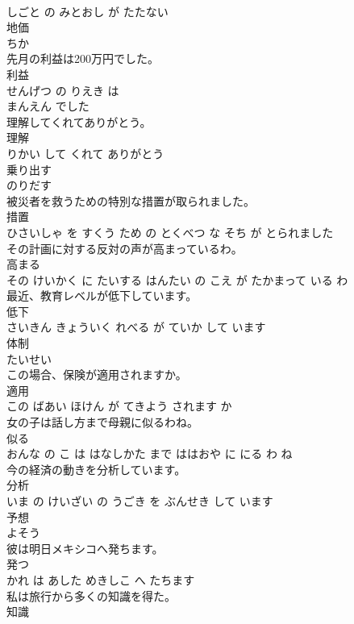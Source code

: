 \documentclass[8pt]{extreport}
\begin{document}
\begin{CJK}{UTF8}{min}
\\	しごと の みとおし が たたない			
\\	地価	
\\	ちか		
\\	先月の利益は200万円でした。	
\\	利益 
\\	せんげつ の りえき は 
\\	まんえん でした			
\\	理解してくれてありがとう。	
\\	理解 
\\	りかい して くれて ありがとう			
\\	乗り出す	
\\	のりだす		
\\	被災者を救うための特別な措置が取られました。	
\\	措置 
\\	ひさいしゃ を すくう ため の とくべつ な そち が とられました			
\\	その計画に対する反対の声が高まっているわ。	
\\	高まる 
\\	その けいかく に たいする はんたい の こえ が たかまって いる わ			
\\	最近、教育レベルが低下しています。	
\\	低下 
\\	さいきん きょういく れべる が ていか して います			
\\	体制	
\\	たいせい		
\\	この場合、保険が適用されますか。	
\\	適用 
\\	この ばあい ほけん が てきよう されます か			
\\	女の子は話し方まで母親に似るわね。	
\\	似る 
\\	おんな の こ は はなしかた まで ははおや に にる わ ね			
\\	今の経済の動きを分析しています。	
\\	分析 
\\	いま の けいざい の うごき を ぶんせき して います			
\\	予想	
\\	よそう		
\\	彼は明日メキシコへ発ちます。	
\\	発つ 
\\	かれ は あした めきしこ へ たちます			
\\	私は旅行から多くの知識を得た。	
\\	知識 

\end{CJK}
\end{document}
